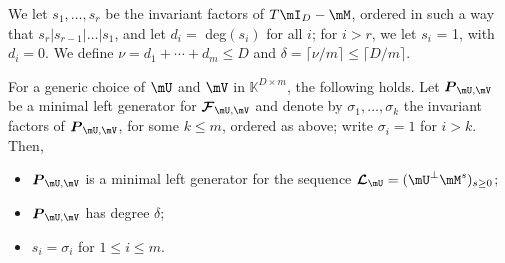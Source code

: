 \documentclass[12pt]{article}
\newcommand{\mat}[1]{\bm{\MakeUppercase{#1}}} %
\newcommand{\seq}{\mat{\mathcal{F}}} %
\newcommand{\seqL}{\mat{\mathcal{L}}} %
\newcommand{\todo}[1]{\textcolor{red}{({\bf todo:} #1)}}
\def\K{\mathbb{K}}
\def\K {\ensuremath{\mathbb{K}}}
\begin{document}
We let $s_1, \dots, s_r$ be the invariant factors of $T\mI_D
- \mM$, ordered in such a way that $s_r | s_{r-1}| \dots | s_1$, and
let $d_i = $ deg$(s_i)$ for all $i$; for $i > r$, we let $s_i$ = 1,
with $d_i = 0$.  We define $\nu = d_1 + \cdots + d_m \le D$ and
$\delta = \lceil \nu / m \rceil \le \lceil D / m \rceil$.



\begin{theorem}
  \label{randXY}
  For a generic choice of $\mU$ and $\mV$ in $\K^{D \times m}$, the
  following holds.  Let $\mat{P}_{\mU,\mV}$ be a minimal left
  generator for $\seq_{\mU,\mV}$ and denote by $\sigma_1, \dots,
  \sigma_k$ the invariant factors of $\mat{P}_{\mU,\mV}$, for some $k
  \le m$, ordered as above; write $\sigma_i=1$ for $i > k$. Then,
  \begin{itemize}
  \item $\mat{P}_{\mU,\mV}$ is a minimal left generator for the
    sequence $\seqL_{\mU} = (\mU^\perp \mM^s)_{s \ge 0}$;
  \item $\mat{P}_{\mU,\mV}$ has degree $\delta$;
  \item $s_i = \sigma_i$ for $1 \le i \le m$.
  \end{itemize}
\end{theorem}
\end{document}
